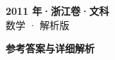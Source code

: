 \documentclass[zihao=-4, a4paper]{ctexart}
\begin{document}
\begin{center}
  {\Large\bfseries 2011 年·浙江卷·文科}\\[4pt]
  {\large 数学 · 解析版}
\end{center}
\medskip
{}

\clearpage
{}
\begin{center}{\Large\bfseries 参考答案与详细解析}\end{center}
\medskip

\end{document}
